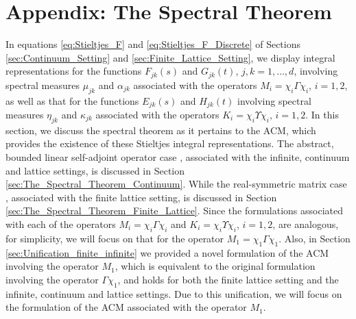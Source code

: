\documentclass{cmslatex}
\begin{document}
\section{Appendix: The Spectral Theorem} 
\label{sec:The_Spectral_Theorem}
%
In equations \eqref{eq:Stieltjes_F} and
\eqref{eq:Stieltjes_F_Discrete} of Sections 
\ref{sec:Continuum_Setting} and \ref{sec:Finite_Lattice_Setting},
we display integral 
representations for the functions $F_{jk}(s)$ and
$G_{jk}(t)$, $j,k=1,\ldots,d$, involving spectral measures $\mu_{jk}$ and
$\alpha_{jk}$ associated with the operators $M_i=\chi_i\Gamma\chi_i$, $i=1,2$, as
well as that for the functions 
$E_{jk}(s)$ and $H_{jk}(t)$ involving spectral measures $\eta_{jk}$ and
$\kappa_{jk}$ associated with the operators $K_i=\chi_i\Upsilon\chi_i$, $i=1,2$. In this section, we
discuss the spectral theorem as it pertains to the ACM, which
provides the existence of these Stieltjes integral representations. The abstract,
bounded linear self-adjoint operator case \cite{Reed-1980,Stone:64},
associated with the infinite, continuum and lattice settings, is
discussed in Section \ref{sec:The_Spectral_Theorem_Continuum}. While
the real-symmetric matrix case
\cite{Kreyszig:JWS-1989,Halmos-1958,Stakgold:BVP:2000}, associated with
the finite lattice setting, is discussed in Section
\ref{sec:The_Spectral_Theorem_Finite_Lattice}. Since the formulations
associated with each of the operators $M_i=\chi_i\Gamma\chi_i$ and $K_i=\chi_i\Upsilon\chi_i$,
$i=1,2$, are analogous, for simplicity, we will focus on that for the
operator $M_1=\chi_1\Gamma\chi_1$. Also, in Section
\ref{sec:Unification_finite_infinite} we provided a novel formulation
of the ACM involving the operator $M_1$, which is 
equivalent to the original formulation 
\cite{Golden:CMP-473,Bruno:PRSLA-353} involving the operator $\Gamma\chi_1$, and holds for
both the finite lattice setting and the infinite, continuum and lattice
settings. Due to this unification, we will focus on the formulation
of the ACM associated with the operator $M_1$. 
%
\end{document}
